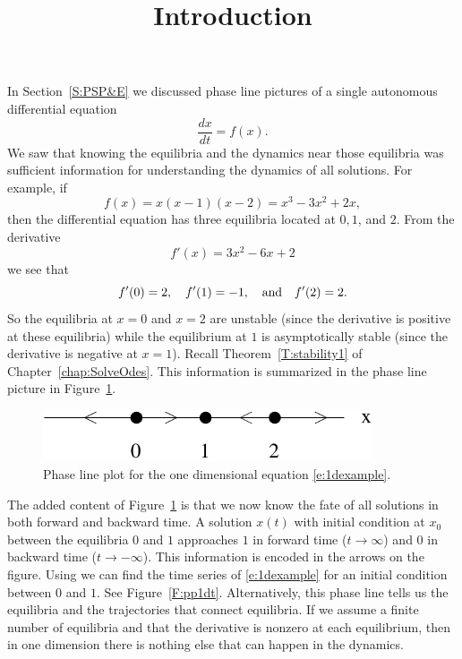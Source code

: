 \documentclass{ximera}
\title{Introduction}
\begin{document}
\begin{abstract}
\end{abstract}
\maketitle


\label{S:introAPNS}

In Section~\ref{S:PSP&E} we discussed phase line pictures of 
a single autonomous 
differential equation 
\[
\frac{dx}{dt} = f(x).
\]
We saw that knowing the equilibria and the dynamics 
near those equilibria was sufficient information for understanding 
the dynamics of all solutions.  For example, if 
\begin{equation}  \label{e:1dexample}
f(x) = x(x-1)(x-2)=x^3-3x^2+2x,
\end{equation}
then the differential equation has three equilibria located at 
$0,1$, and $2$.  From the derivative
\[
f'(x)=3x^2-6x+2
\]
we see that 
\[
f'(0)=2, \quad f'(1)=-1, \quad\mbox{and}\quad f'(2)=2.
\]
So the equilibria at $x=0$ and $x=2$ are unstable 
(since the derivative 
is positive at these equilibria) while the equilibrium at $1$ is 
asymptotically stable (since the derivative is negative at $x=1$). 
Recall Theorem~\ref{T:stability1} of Chapter~\ref{chap:SolveOdes}.  
This information is summarized in the phase line picture in 
Figure~\ref{F:pp1d}.

\begin{figure}[htb]
           \centerline{%
            \includegraphics[height=0.6in]{../figures/pp1d.pdf}}
           \caption{Phase line plot for the one dimensional equation
	\protect\eqref{e:1dexample}.}
           \label{F:pp1d}
\end{figure}

The added content of Figure~\ref{F:pp1d} is that we now know the 
fate of all solutions in both forward and backward time.  A 
solution $x(t)$ with initial condition at $x_0$ between the 
equilibria $0$ and $1$ approaches $1$ in forward time
($t\to\infty$) and $0$ in backward time ($t\to -\infty$).  
This information is 
encoded in the arrows on the figure.  Using {\dfield}
 we can 
find the time series of \eqref{e:1dexample} for an initial condition 
between $0$ and $1$.  See Figure~\ref{F:pp1dt}. Alternatively, this  
phase line tells us the equilibria and the trajectories that connect 
equilibria.  If we assume a finite number of equilibria and that the
derivative is nonzero at each equilibrium, then in one dimension 
there is nothing else that can happen in the dynamics.
\end{document}
